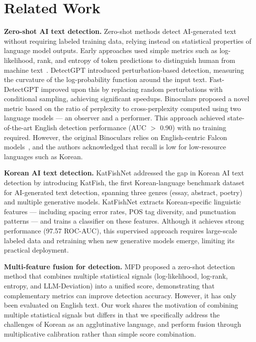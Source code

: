 \documentclass{article}
\begin{document}
\section{Related Work}

\textbf{Zero-shot AI text detection.} Zero-shot methods detect AI-generated text without requiring labeled training data, relying instead on statistical properties of language model outputs. Early approaches used simple metrics such as log-likelihood, rank, and entropy of token predictions to distinguish human from machine text~\cite{solaiman2019release, gehrmann2019gltr, ippolito2020automatic}. DetectGPT \cite{mitchell2023detectgpt} introduced perturbation-based detection, measuring the curvature of the log-probability function around the input text. Fast-DetectGPT \cite{bao2024fastdetectgpt} improved upon this by replacing random perturbations with conditional sampling, achieving significant speedups. Binoculars \cite{hans2024binoculars} proposed a novel metric based on the ratio of perplexity to cross-perplexity computed using two language models --- an observer and a performer. This approach achieved state-of-the-art English detection performance (AUC $>$ 0.90) with no training required. However, the original Binoculars relies on English-centric Falcon models~\cite{penedo2023falcon}, and the authors acknowledged that recall is low for low-resource languages such as Korean.

\textbf{Korean AI text detection.} KatFishNet \cite{park2025katfishnet} addressed the gap in Korean AI text detection by introducing KatFish, the first Korean-language benchmark dataset for AI-generated text detection, spanning three genres (essay, abstract, poetry) and multiple generative models. KatFishNet extracts Korean-specific linguistic features --- including spacing error rates, POS tag diversity, and punctuation patterns --- and trains a classifier on these features. Although it achieves strong performance (97.57 ROC-AUC), this supervised approach requires large-scale labeled data and retraining when new generative models emerge, limiting its practical deployment.

\textbf{Multi-feature fusion for detection.} MFD \cite{wu2023mfd} proposed a zero-shot detection method that combines multiple statistical signals (log-likelihood, log-rank, entropy, and LLM-Deviation) into a unified score, demonstrating that complementary metrics can improve detection accuracy. However, it has only been evaluated on English text. Our work shares the motivation of combining multiple statistical signals but differs in that we specifically address the challenges of Korean as an agglutinative language, and perform fusion through multiplicative calibration rather than simple score combination.
\end{document}
